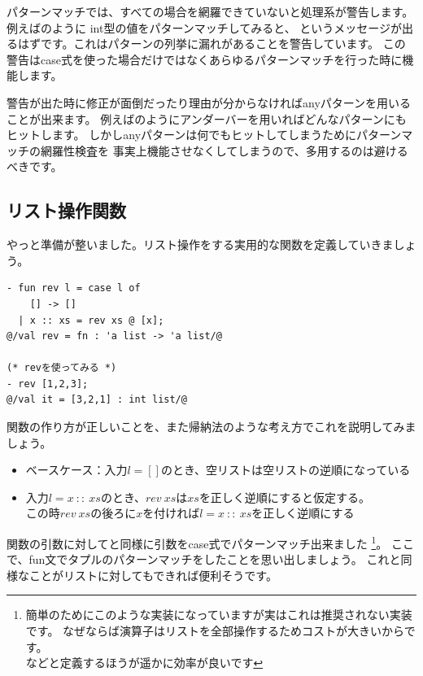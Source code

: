 \documentclass[11pt,a4paper]{article}
\begin{document}
パターンマッチでは、すべての場合を網羅できていないと処理系が警告します。\\
例えばのように
int型の値をパターンマッチしてみると、
というメッセージが出るはずです。これはパターンの列挙に漏れがあることを警告しています。
この警告はcase式を使った場合だけではなくあらゆるパターンマッチを行った時に機能します。

警告が出た時に修正が面倒だったり理由が分からなければanyパターンを用いることが出来ます。
例えばのようにアンダーバーを用いればどんなパターンにもヒットします。
しかしanyパターンは何でもヒットしてしまうためにパターンマッチの網羅性検査を
事実上機能させなくしてしまうので、多用するのは避けるべきです。

\subsection{リスト操作関数}

やっと準備が整いました。リスト操作をする実用的な関数を定義していきましょう。

\begin{lstlisting}[caption=リストを逆順にする関数revを定義する,label=code:rev1]
- fun rev l = case l of
    [] -> []
  | x :: xs = rev xs @ [x];
@/val rev = fn : 'a list -> 'a list/@

(* revを使ってみる *)
- rev [1,2,3];
@/val it = [3,2,1] : int list/@
\end{lstlisting}

関数の作り方が正しいことを、また帰納法のような考え方でこれを説明してみましょう。
\begin{itemize}
\item ベースケース：入力$l=[]$のとき、空リストは空リストの逆順になっている
\item 入力$l = x \ :: \ xs$のとき、$rev \ xs$は$xs$を正しく逆順にすると仮定する。\\
  この時$rev \ xs$の後ろに$x$を付ければ$l = x \ :: \ xs$を正しく逆順にする
\end{itemize}

関数の引数に対してと同様に引数をcase式でパターンマッチ出来ました
\footnote{簡単のためにこのような実装になっていますが実はこれは推奨されない実装です。
なぜならば演算子はリストを全部操作するためコストが大きいからです。\\
などと定義するほうが遥かに効率が良いです}。
ここで、fun文でタプルのパターンマッチをしたことを思い出しましょう。
これと同様なことがリストに対してもできれば便利そうです。
\end{document}
